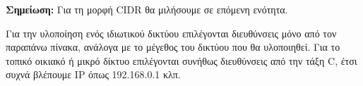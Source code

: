\textbf{Σημείωση:} Για τη μορφή CIDR θα μιλήσουμε σε επόμενη ενότητα.

Για την υλοποίηση ενός ιδιωτικού δικτύου επιλέγονται διευθύνσεις μόνο από τον παραπάνω πίνακα, ανάλογα με το μέγεθος του δικτύου που θα υλοποιηθεί. Για το τοπικό οικιακό ή μικρό δίκτυο επιλέγονται συνήθως διευθύνσεις από την τάξη C, έτσι συχνά βλέπουμε IP όπως 192.168.0.1 κλπ.
